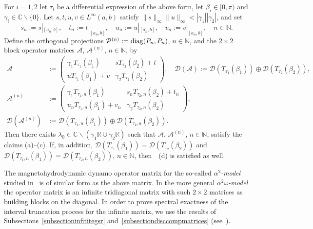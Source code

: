 \documentclass[a4paper,reqno]{amsart}
\begin{document}
\begin{theorem}\label{thmSLmatrix}
For $i=1,2$ let $\tau_i$ be a differential expression of the above form, let $\beta_i\in [0,\pi)$ and $\gamma_i\in{\mathbb{C}}\backslash\{0\}$. Let $s,t, u,v\in L^{\infty}(a,b)$ satisfy $\|s\|_{\infty}\|u\|_{\infty}<|\gamma_1| |\gamma_2|$, and set 
$$s_n:=s|_{[a_n,b]}, \quad t_n:=t|_{[a_n,b]}, \quad u_n:=u|_{[a_n,b]}, \quad v_n:=v|_{[a_n,b]}, \quad n\in{\mathbb{N}}.$$
Define the orthogonal projections ${\mathcal P}^{(n)}:={\rm diag}(P_n,P_n)$, $n\in{\mathbb{N}}$, and the $2\times 2$ block operator matrices ${\mathcal A}$, ${\mathcal A}^{(n)}$, $n\in{\mathbb{N}}$, by
\begin{align*}
{\mathcal A}&:=\begin{pmatrix} \gamma_1 T_{\tau_1}(\beta_1) & s T_{\tau_2}(\beta_2)+t \\ u T_{\tau_1}(\beta_1)+v & \gamma_2 T_{\tau_2}(\beta_2)\end{pmatrix}, \quad {\mathcal D}({\mathcal A}):={\mathcal D}(T_{\tau_1}(\beta_1))\oplus{\mathcal D}(T_{\tau_2}(\beta_2)),\\
{\mathcal A}^{(n)}&:=\begin{pmatrix} \gamma_1 T_{\tau_1,n}(\beta_1) & s_n T_{\tau_2,n}(\beta_2)+t_n \\ u_n T_{\tau_1,n}(\beta_1)+v_n & \gamma_2 T_{\tau_2,n}(\beta_2)\end{pmatrix}, \\ {\mathcal D}({\mathcal A}^{(n)})&:={\mathcal D}(T_{\tau_1,n}(\beta_1))\oplus{\mathcal D}(T_{\tau_2,n}(\beta_2)).
\end{align*}
Then there exists $\lambda_0\in{\mathbb{C}}\backslash (\gamma_1 {\mathbb{R}}\cup\gamma_2{\mathbb{R}})$ such that ${\mathcal A}$, ${\mathcal A}^{(n)}$, $n\in{\mathbb{N}}$, satisfy the claims {\rm (a)--(c)}.
If, in addition, ${\mathcal D}(T_{\tau_1}(\beta_1))={\mathcal D}(T_{\tau_2}(\beta_2))$ and  ${\mathcal D}(T_{\tau_1,n}(\beta_1))={\mathcal D}(T_{\tau_2,n}(\beta_2))$, $n\in{\mathbb{N}}$, then~{\rm~(d)} is satisfied as well.
\end{theorem}

\begin{rem}
The magnetohydrodynamic dynamo operator matrix for the so-called \emph{$\alpha^2$-model} studied in~\cite{dynamopaper} is of similar form as the above matrix. In the more general \emph{$\alpha^2\omega$-model} the operator matrix is an infinite tridiagonal matrix with such $2\times 2$ matrices as building blocks on the diagonal. In order to prove spectral exactness of the interval truncation process for the infinite matrix, we use the results of Subsections~\ref{subsectioninfititegsr} and~\ref{subsectiondisccompmatrices} (see~\cite{dynamopaper}).
\end{rem}
\end{document}
